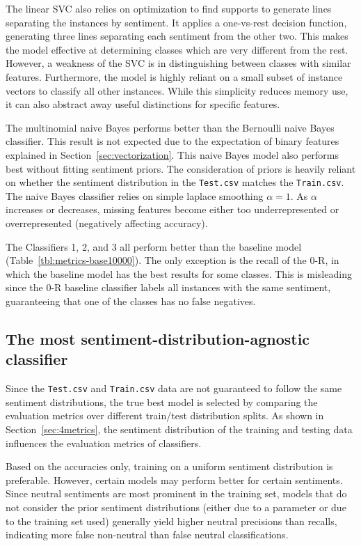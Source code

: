 \documentclass[11pt]{article}
\begin{document}
The linear SVC also relies on optimization to find supports to generate lines separating the instances by sentiment.
It applies a one-vs-rest decision function, generating three lines separating each sentiment from the other two.
This makes the model effective at determining classes which are very different from the rest.
However, a weakness of the SVC is in distinguishing between classes with similar features. 
Furthermore, the model is highly reliant on a small subset of instance vectors to classify all other instances. 
While this simplicity reduces memory use, it can also abstract away useful distinctions for specific features.


The multinomial naive Bayes performs better than the Bernoulli naive Bayes classifier.
This result is not expected due to the expectation of binary features explained in Section~\ref{sec:vectorization}.
This naive Bayes model also performs best without fitting sentiment priors.
The consideration of priors is heavily reliant on whether the sentiment distribution in the \texttt{Test.csv} matches the \texttt{Train.csv}.
The naive Bayes classifier relies on simple laplace smoothing $\alpha = 1$. 
As $\alpha$ increases or decreases,
missing features become either too underrepresented or overrepresented (negatively affecting accuracy).

The Classifiers 1, 2, and 3 all perform better than the baseline model (Table~\ref{tbl:metrics-base10000}). 
The only exception is the recall of the 0-R, in which the baseline model has the best results for some classes.
This is misleading since the 0-R baseline classifier labels all instances with the same sentiment, 
guaranteeing that one of the classes has no false negatives.


\subsection{The most sentiment-distribution-agnostic classifier}\label{sec:agnostic}

Since the \texttt{Test.csv} and \texttt{Train.csv} data are not guaranteed to follow the same sentiment distributions,
the true best model is selected by comparing the evaluation metrics over different train/test distribution splits.
As shown in Section~\ref{sec:4metrics}, the sentiment distribution of the training and testing data influences the evaluation metrics of classifiers.

Based on the accuracies only, training on a uniform sentiment distribution is preferable.
However, certain models may perform better for certain sentiments.
Since neutral sentiments are most prominent in the training set, models that do not consider the prior sentiment distributions 
(either due to a parameter or due to the training set used) generally yield higher neutral precisions than recalls,
indicating more false non-neutral than false neutral classifications.
\end{document}
